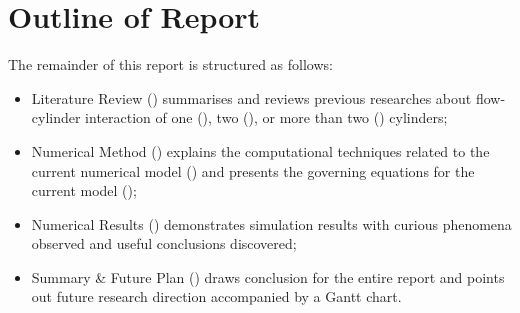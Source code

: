 \section{Outline of Report}
The remainder of this report is structured as follows:
\begin{itemize}
  \item Literature Review () summarises and reviews previous researches about flow-cylinder interaction of one (), two (), or more than two () cylinders;
  \item Numerical Method () explains the computational techniques related to the current numerical model () and presents the governing equations for the current model ();
  \item Numerical Results () demonstrates simulation results with curious phenomena observed and useful conclusions discovered;
  \item Summary \& Future Plan () draws conclusion for the entire report and points out future research direction accompanied by a Gantt chart.
\end{itemize}
